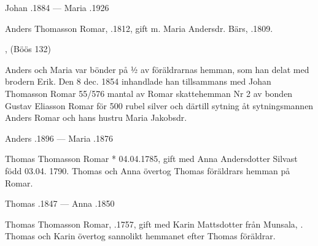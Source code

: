 Johan .1884  ---  Maria .1926


Anders Thomasson Romar, .1812, gift m. Maria Andersdr. Bärs, .1809.
\begin{jhchildren}
  \item {}
  \item {}
  \item {}
  \item {}
  \item {}
  \item {}, (Böös 132)
  \item {}
  \item {}
\end{jhchildren}
Anders och Maria var bönder på ½ av föräldrarnas hemman, som han delat med brodern Erik. Den 8 dec. 1854 inhandlade han tillsammans med Johan Thomasson Romar 55/576 mantal av Romar skattehemman Nr 2 av bonden Gustav Eliasson Romar för 500 rubel silver och därtill sytning åt sytningsmannen Anders Romar och hans hustru Maria Jakobsdr.

Anders .1896  ---  Maria .1876


Thomas Thomasson Romar * 04.04.1785, gift med Anna Andersdotter Silvast född 03.04. 1790.
Thomas och Anna övertog Thomas föräldrars hemman på Romar.
\begin{jhchildren}
  \item {}
  \item {}
\end{jhchildren}

Thomas .1847  ---  Anna .1850


Thomas Thomasson Romar, .1757,  gift med Karin Mattsdotter från Munsala, . Thomas och Karin övertog sannolikt hemmanet efter Thomas föräldrar.
\begin{jhchildren}
  \item {}
\end{jhchildren}

